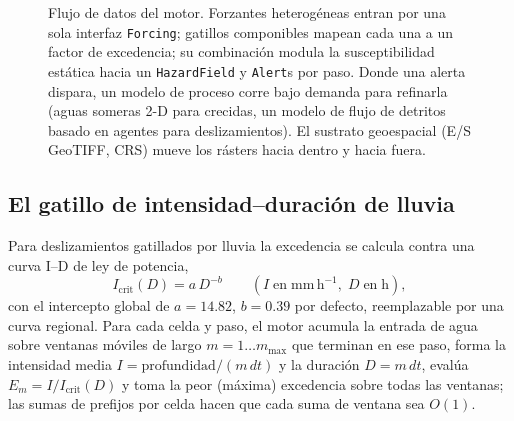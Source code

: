 \documentclass[authoryear,preprint,review,12pt]{elsarticle}
\begin{document}
\begin{figure}[t]
\centering
{}
\caption{Flujo de datos del motor. Forzantes heterogéneas entran por una sola
interfaz \texttt{Forcing}; gatillos componibles mapean cada una a un factor de
excedencia; su combinación modula la susceptibilidad estática hacia un
\texttt{HazardField} y \texttt{Alert}s por paso. Donde una alerta dispara, un
modelo de proceso corre bajo demanda para refinarla (aguas someras 2-D para
crecidas, un modelo de flujo de detritos basado en agentes para deslizamientos).
El sustrato geoespacial (E/S GeoTIFF, CRS) mueve los rásters hacia dentro y
hacia fuera.}
\label{fig:arch}
\end{figure}

\subsection{El gatillo de intensidad--duración de lluvia}

Para deslizamientos gatillados por lluvia la excedencia se calcula contra una
curva I--D de ley de potencia,
\begin{equation}
I_{\mathrm{crit}}(D)=a\,D^{-b}\qquad(I\;\mathrm{en\;mm\,h^{-1}},\;D\;\mathrm{en\;h}),
\label{eq:id}
\end{equation}
con el intercepto global de \citet{caine1980} $a=14.82$, $b=0.39$ por defecto,
reemplazable por una curva regional. Para cada celda y paso, el motor acumula la
entrada de agua sobre ventanas móviles de largo $m=1\ldots m_{\max}$ que terminan
en ese paso, forma la intensidad media $I=\mathrm{profundidad}/(m\,dt)$ y la
duración $D=m\,dt$, evalúa $E_m=I/I_{\mathrm{crit}}(D)$ y toma la peor (máxima)
excedencia sobre todas las ventanas; las sumas de prefijos por celda hacen que
cada suma de ventana sea $O(1)$.
\end{document}
